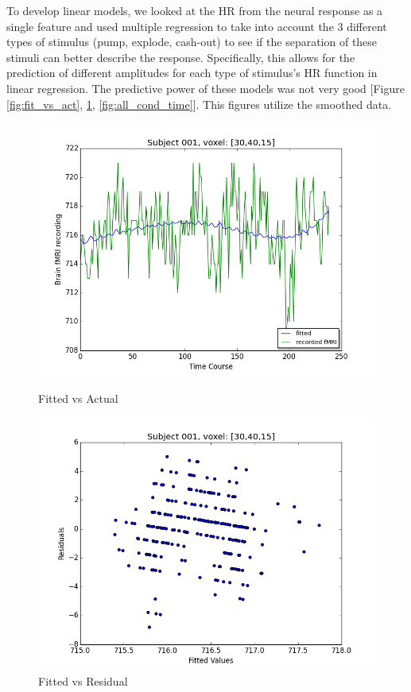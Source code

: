 \par To develop linear models, we looked at the HR from the neural response 
as a single feature and used multiple regression to take into account the 3 
different types of stimulus (pump, explode, cash-out) to see if the 
separation of these stimuli can better describe the response. Specifically, 
this allows for the prediction of different amplitudes for each type of 
stimulus's HR function in linear regression. The predictive power of these 
models was not very good [Figure \ref{fig:fit_vs_act}, \ref{fig:fit_vs_res}, 
\ref{fig:all_cond_time}]. This figures utilize the smoothed data.
  
\begin{figure}[ht]
\centering
\begin{minipage}[b]{0.45\linewidth}
	\centering
	\includegraphics[width=.8\linewidth]{images/Fitted_v_Actual.png} 
	\caption{Fitted vs Actual}
	\label{fig:fit_vs_act}
\end{minipage}	
\quad
\begin{minipage}[b]{0.45\linewidth}
	\centering
		\includegraphics[width=.8\linewidth]{images/Fitted_v_Residuals.png} 
	\caption{Fitted vs Residual}
	\label{fig:fit_vs_res}
\end{minipage}
\end{figure}





